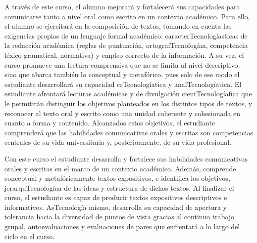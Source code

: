 \begin{syllabus}


\begin{justification}
A través de este curso, el alumno mejorará y fortalecerá sus capacidades para comunicarse tanto a nivel oral como escrito en un contexto académico. Para ello, el alumno se ejercitará en la composición de textos, tomando en cuenta las exigencias propias de un lenguaje formal académico: caracterTecnologíasticas de la redacción académica (reglas de puntuación, ortografTecnologíaa, competencia léxico gramatical, normativa) y empleo correcto de la información. A su vez, el curso promueve una lectura comprensiva que no se limita al nivel descriptivo, sino que abarca también lo conceptual y metafórico, pues solo de ese modo el estudiante desarrollará su capacidad crTecnologíatica y analTecnologíatica. El estudiante afrontará lecturas académicas y de divulgación cientTecnologíafica que le permitirán distinguir los objetivos planteados en los distintos tipos de textos, y reconocer al texto oral y escrito como una unidad coherente y cohesionada en cuanto a forma y contenido. Alcanzados estos objetivos, el estudiante comprenderá que las habilidades comunicativas orales y escritas son competencias centrales de su vida universitaria y, posteriormente, de su vida profesional. 
\end{justification}

\begin{goals}
\item Con este curso el estudiante desarrolla y fortalece sus habilidades comunicativas orales y escritas en el marco de un contexto académico. Además, comprende conceptual y metafóricamente textos expositivos, e identifica los objetivos, jerarquTecnologíaa de las ideas y estructura de dichos textos. Al finalizar el curso, el estudiante es capaz de producir textos expositivos descriptivos e informativos. AsTecnología mismo, desarrolla su capacidad de apertura y tolerancia hacia la diversidad de puntos de vista gracias al continuo trabajo grupal, autoevaluaciones y evaluaciones de pares que enfrentará a lo largo del ciclo en el curso. 
\end{goals}

\begin{outcomes}   
     \item {}
     \item {}
     \item {}
     \item {}
\end{outcomes}


\end{syllabus}
